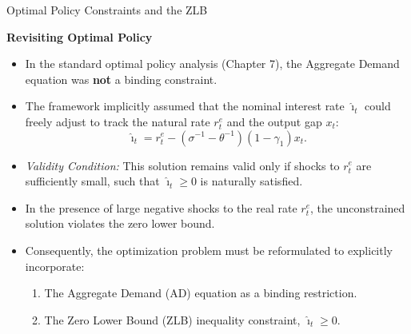 \documentclass[11pt,aspectratio=169]{beamer}
\begin{document}
\begin{frame}{Optimal Policy Constraints and the ZLB}
\small

\textbf{Revisiting Optimal Policy}
\begin{itemize}
    \item In the standard optimal policy analysis (Chapter 7), the Aggregate Demand equation was \textbf{not} a binding constraint.
    \item The framework implicitly assumed that the nominal interest rate $\hat{\imath}_{t}$ could freely adjust to track the natural rate $r_t^e$ and the output gap $x_t$:
    \begin{equation*}
        \hat{\imath}_{t}=r_{t}^{e}-(\sigma ^{-1}-\theta ^{-1})(1-\gamma _{1})x_{t}.
    \end{equation*}
    \item \textit{Validity Condition:} This solution remains valid only if shocks to $r_t^e$ are sufficiently small, such that $\hat{\imath}_{t} \ge 0$ is naturally satisfied.
    \item In the presence of large negative shocks to the real rate $r_{t}^{e}$, the unconstrained solution violates the zero lower bound.
    \item Consequently, the optimization problem must be reformulated to explicitly incorporate:
    \begin{enumerate}
        \item The Aggregate Demand (AD) equation as a binding restriction.
        \item The Zero Lower Bound (ZLB) inequality constraint, $\hat{\imath}_{t} \geq 0$.
    \end{enumerate}
\end{itemize}
\end{frame}
\end{document}
